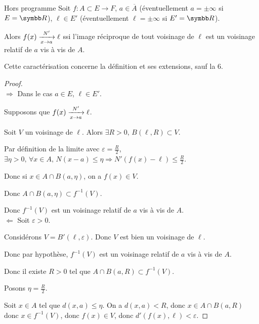 \begin{theoreme}{Hors programme}{}
    Soit $f : A \subset E \to F$, $a \in \overline A$ (éventuellement $a = \pm \infty$ si $E = \R$), 
    $\ell \in E'$ (éventuellement $\ell = \pm \infty$ si $E' = \R$).

    Alors $f(x) \limitnorme{N'}{x}{a} \ell$ ssi l'image réciproque de tout voisinage de 
    $\ell$ est un voisinage relatif de $a$ vis à vis de $A$.
\end{theoreme}

\begin{remarque}
    Cette caractérisation concerne la définition et ses extensions, sauf la 6.
\end{remarque}


\begin{proof}~\\
    $\Rightarrow$ Dans le cas $a \in E$, $\ell \in E'$. 

    Supposons que $f(x) \limitnorme{N'}{x}{a} \ell$.

    Soit $V$ un voisinage de $\ell$. Alors $\exists R > 0, \, B(\ell, R) \subset V$.

    Par définition de la limite avec $\varepsilon = \frac R 2$, $\exists \eta > 0, \, \forall x \in A, \, N(x - a) \leqslant \eta \Rightarrow N'(f(x) - \ell) \leqslant \frac R 2$.

    Donc si $x \in A \cap B(a, \eta)$, on a $f(x) \in V$. 

    Donc $A \cap B(a, \eta) \subset f^{-1}(V)$. 

    Donc $f^{-1}(V)$ est un voisinage relatif de $a$ vis à vis de $A$. \\

    $\Leftarrow$ Soit $\varepsilon > 0$. 

    Considérons $V = B'(\ell, \varepsilon)$. Donc $V$ est bien un voisinage de $\ell$. 

    Donc par hypothèse, $f^{-1}(V)$ est un voisinage relatif de $a$ vis à vis de $A$.

    Donc il existe $R > 0$ tel que $A \cap B(a, R) \subset f^{-1}(V)$.

    Posons $\eta = \frac R 2$. 

    Soit $x \in A$ tel que $d(x, a) \leqslant \eta$. On a $d(x, a) < R$, 
    donc $x \in A \cap B(a, R) $ donc $x \in f^{-1}(V)$, donc $f(x) \in V$, donc
    $d'(f(x), \ell) < \varepsilon$.
\end{proof}

